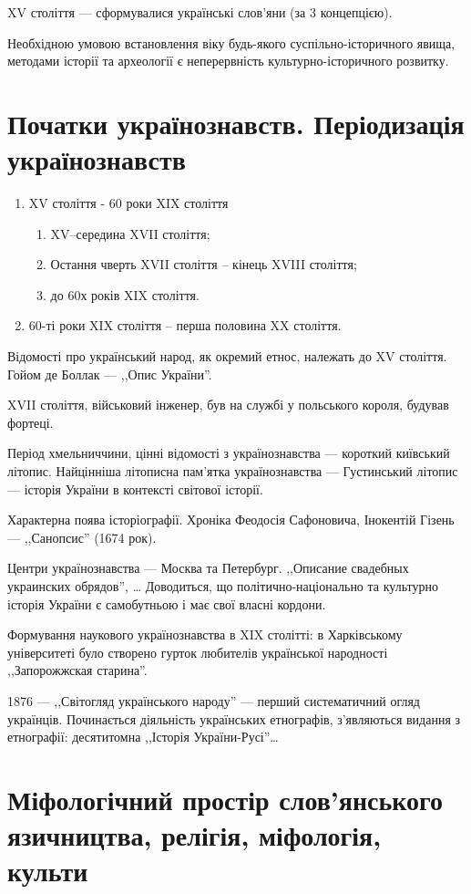 \documentclass[a5paper,10pt,titlepage,pdftex,headsepline]{scrartcl}
\begin{document}
XV століття --- сформувалися українські слов’яни (за 3 концепцією).

Необхідною умовою встановлення віку будь-якого суспільно-історичного явища, методами історії та археології є неперервність культурно-історичного розвитку.
\section{Початки українознавств. Періодизація українознавств}
\begin{enumerate}
	\item XV століття - 60 роки XIX століття
	\begin{enumerate}
		\item XV--середина XVII століття;
		\item Остання чверть XVII століття -- кінець XVIII століття;
		\item до 60х років XIX століття.
	\end{enumerate}
	\item 60-ті роки XIX століття -- перша половина XX століття.
\end{enumerate}
Відомості про український народ, як окремий етнос, належать до XV століття.
Гойом де Боллак --- ,,Опис України''.

XVII століття, військовий інженер, був на службі у польського короля, будував фортеці.

Період хмельниччини, цінні відомості з українознавства --- короткий київський літопис.
Найцінніша літописна пам’ятка українознавства --- Густинський літопис --- історія України в контексті світової історії.

Характерна поява історіографії.
Хроніка Феодосія Сафоновича, Інокентій Гізень --- ,,Санопсис'' (1674 рок).

Центри українознавства --- Москва та Петербург.
,,Описание свадебных украинских обрядов'', \dots
Доводиться, що політично-національно та культурно історія України є самобутньою і має свої власні кордони.

Формування наукового українознавства в XIX столітті:
 в Харківському університеті було створено гурток любителів української народності ,,Запорожжская старина''.
 
 1876 --- ,,Світогляд українського народу'' --- перший систематичний огляд українців.
 Починається діяльність українських етнографів, з’являються видання з етнографії: десятитомна ,,Історія України-Русі''\dots
\section{Міфологічний простір слов’янського язичництва, релігія, міфологія, культи}
\end{document}
